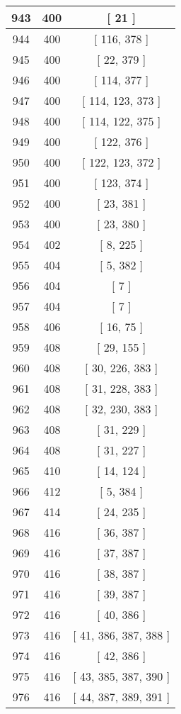 \begin{center}
\begin{longtable}[H]{|| c c c ||}
\hline
943 & 400 & [ 21 ] \\ 
\hline
944 & 400 & [ 116, 378 ] \\ 
\hline
945 & 400 & [ 22, 379 ] \\ 
\hline
946 & 400 & [ 114, 377 ] \\ 
\hline
947 & 400 & [ 114, 123, 373 ] \\ 
\hline
948 & 400 & [ 114, 122, 375 ] \\ 
\hline
949 & 400 & [ 122, 376 ] \\ 
\hline
950 & 400 & [ 122, 123, 372 ] \\ 
\hline
951 & 400 & [ 123, 374 ] \\ 
\hline
952 & 400 & [ 23, 381 ] \\ 
\hline
953 & 400 & [ 23, 380 ] \\ 
\hline
954 & 402 & [ 8, 225 ] \\ 
\hline
955 & 404 & [ 5, 382 ] \\ 
\hline
956 & 404 & [ 7 ] \\ 
\hline
957 & 404 & [ 7 ] \\ 
\hline
958 & 406 & [ 16, 75 ] \\ 
\hline
959 & 408 & [ 29, 155 ] \\ 
\hline
960 & 408 & [ 30, 226, 383 ] \\ 
\hline
961 & 408 & [ 31, 228, 383 ] \\ 
\hline
962 & 408 & [ 32, 230, 383 ] \\ 
\hline
963 & 408 & [ 31, 229 ] \\ 
\hline
964 & 408 & [ 31, 227 ] \\ 
\hline
965 & 410 & [ 14, 124 ] \\ 
\hline
966 & 412 & [ 5, 384 ] \\ 
\hline
967 & 414 & [ 24, 235 ] \\ 
\hline
968 & 416 & [ 36, 387 ] \\ 
\hline
969 & 416 & [ 37, 387 ] \\ 
\hline
970 & 416 & [ 38, 387 ] \\ 
\hline
971 & 416 & [ 39, 387 ] \\ 
\hline
972 & 416 & [ 40, 386 ] \\ 
\hline
973 & 416 & [ 41, 386, 387, 388 ] \\ 
\hline
974 & 416 & [ 42, 386 ] \\ 
\hline
975 & 416 & [ 43, 385, 387, 390 ] \\ 
\hline
976 & 416 & [ 44, 387, 389, 391 ] \\ 
\hline

\end{longtable}
\end{center}
